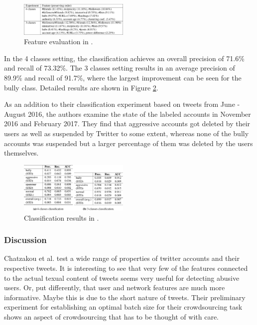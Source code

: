 \documentclass{proseminar}
\begin{document}
\begin{figure}
\centering
\includegraphics[width=0.47\textwidth]{img/twitter_features}
\caption{Feature evaluation in \cite{Twitter:2017}.}
\label{fig:twitter_features}
\end{figure}

In the 4 classes setting, the classification achieves an overall precision of 71.6\% and recall of 73.32\%. The 3 classes setting results in an average precision of 89.9\% and recall of 91.7\%, where the largest improvement can be seen for the bully class. Detailed results are shown in Figure \ref{fig:twitter_results}.

As an addition to their classification experiment based on tweets from June - August 2016, the authors examine the state of the labeled accounts in November 2016 and February 2017. They find that aggressive accounts got deleted by their users as well as suspended by Twitter to some extent, whereas none of the bully accounts was suspended but a larger percentage of them was deleted by the users themselves.

\begin{figure}
\centering
\includegraphics[width=0.47\textwidth]{img/twitter_results}
\caption{Classification results in \cite{Twitter:2017}.}
\label{fig:twitter_results}
\end{figure}

\subsubsection{Discussion} Chatzakou et al. test a wide range of properties of twitter accounts and their respective tweets. It is interesting to see that very few of the features connected to the actual texual content of tweets seems very useful for detecting abusive users. Or, put differently, that user and network features are much more informative. Maybe this is due to the short nature of tweets. Their preliminary experiment for establishing an optimal batch size for their crowdsourcing task shows an aspect of crowdsourcing that has to be thought of with care.
\end{document}
